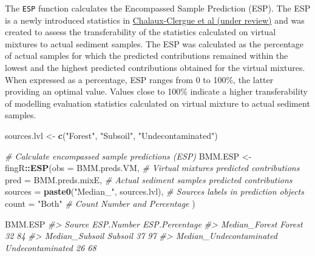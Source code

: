 \documentclass[
]{article}
\newenvironment{Shaded}{\begin{snugshade}}{\end{snugshade}}
\newcommand{\AttributeTok}[1]{\textcolor[rgb]{0.13,0.29,0.53}{#1}}
\newcommand{\CommentTok}[1]{\textcolor[rgb]{0.56,0.35,0.01}{\textit{#1}}}
\newcommand{\FunctionTok}[1]{\textcolor[rgb]{0.13,0.29,0.53}{\textbf{#1}}}
\newcommand{\NormalTok}[1]{#1}
\newcommand{\OtherTok}[1]{\textcolor[rgb]{0.56,0.35,0.01}{#1}}
\newcommand{\SpecialCharTok}[1]{\textcolor[rgb]{0.81,0.36,0.00}{\textbf{#1}}}
\newcommand{\StringTok}[1]{\textcolor[rgb]{0.31,0.60,0.02}{#1}}
\begin{document}
The \texttt{ESP} function calculates the Encompassed Sample Prediction
(ESP). The ESP is a newly introduced statistics in
\href{}{Chalaux-Clergue et al (under review)} and was created to assess
the transferability of the statistics calculated on virtual mixtures to
actual sediment samples. The ESP was calculated as the percentage of
actual samples for which the predicted contributions remained within the
lowest and the highest predicted contributions obtained for the virtual
mixtures. When expressed as a percentage, ESP ranges from 0 to 100\%,
the latter providing an optimal value. Values close to 100\% indicate a
higher transferability of modelling evaluation statistics calculated on
virtual mixture to actual sediment samples.

\begin{Shaded}
\begin{Highlighting}[]
\NormalTok{sources.lvl }\OtherTok{\textless{}{-}} \FunctionTok{c}\NormalTok{(}\StringTok{"Forest"}\NormalTok{, }\StringTok{"Subsoil"}\NormalTok{, }\StringTok{"Undecontaminated"}\NormalTok{)}

\CommentTok{\# Calculate encompassed sample predictions (ESP)}
\NormalTok{BMM.ESP }\OtherTok{\textless{}{-}}\NormalTok{ fingR}\SpecialCharTok{::}\FunctionTok{ESP}\NormalTok{(}\AttributeTok{obs =}\NormalTok{ BMM.preds.VM,                       }\CommentTok{\# Virtual mixtures predicted contributions}
                      \AttributeTok{pred =}\NormalTok{ BMM.preds.mixE,                    }\CommentTok{\# Actual sediment samples predicted contributions}
                      \AttributeTok{sources =} \FunctionTok{paste0}\NormalTok{(}\StringTok{"Median\_"}\NormalTok{, sources.lvl), }\CommentTok{\# Sources labels in prediction objects}
                      \AttributeTok{count =} \StringTok{"Both"}                            \CommentTok{\# Count \textquotesingle{}Number\textquotesingle{} and \textquotesingle{}Percentage\textquotesingle{}}
\NormalTok{                      )}
\end{Highlighting}
\end{Shaded}

\begin{Shaded}
\begin{Highlighting}[]
\NormalTok{BMM.ESP}
\CommentTok{\#\textgreater{}                                   Source ESP.Number ESP.Percentage}
\CommentTok{\#\textgreater{} Median\_Forest                     Forest         32             84}
\CommentTok{\#\textgreater{} Median\_Subsoil                   Subsoil         37             97}
\CommentTok{\#\textgreater{} Median\_Undecontaminated Undecontaminated         26             68}
\end{Highlighting}
\end{Shaded}
\end{document}
